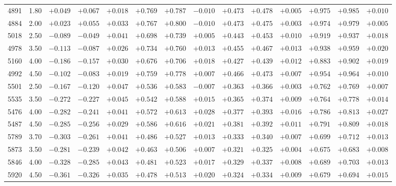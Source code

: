 \documentclass[]{aa}
\begin{document}
\begin{appendix}
\begin{table*}
\begin{center}
\begin{tabular}{llllllllllllll}
4891  &1.80& $ +0.049$&$  +0.067$&$  +0.018$&$  +0.769$&$  +0.787$&$  -0.010$&$  +0.473$&$  +0.478$&$  +0.005$&$  +0.975$&$  +0.985$&$  +0.010$\\
4884  &2.00& $ +0.023$&$  +0.055$&$  +0.033$&$  +0.767$&$  +0.800$&$  -0.010$&$  +0.473$&$  +0.475$&$  +0.003$&$  +0.974$&$  +0.979$&$  +0.005$\\
5018  &2.50& $ -0.089$&$  -0.049$&$  +0.041$&$  +0.698$&$  +0.739$&$  +0.005$&$  +0.443$&$  +0.453$&$  +0.010$&$  +0.919$&$  +0.937$&$  +0.018$\\
4978  &3.50& $ -0.113$&$  -0.087$&$  +0.026$&$  +0.734$&$  +0.760$&$  +0.013$&$  +0.455$&$  +0.467$&$  +0.013$&$  +0.938$&$  +0.959$&$  +0.020$\\
5160  &4.00& $ -0.186$&$  -0.157$&$  +0.030$&$  +0.676$&$  +0.706$&$  +0.018$&$  +0.427$&$  +0.439$&$  +0.012$&$  +0.883$&$  +0.902$&$  +0.019$\\
4992  &4.50& $ -0.102$&$  -0.083$&$  +0.019$&$  +0.759$&$  +0.778$&$  +0.007$&$  +0.466$&$  +0.473$&$  +0.007$&$  +0.954$&$  +0.964$&$  +0.010$\\
5501  &2.50& $ -0.167$&$  -0.120$&$  +0.047$&$  +0.536$&$  +0.583$&$  -0.007$&$  +0.363$&$  +0.366$&$  +0.003$&$  +0.762$&$  +0.769$&$  +0.007$\\
5535  &3.50& $ -0.272$&$  -0.227$&$  +0.045$&$  +0.542$&$  +0.588$&$  +0.015$&$  +0.365$&$  +0.374$&$  +0.009$&$  +0.764$&$  +0.778$&$  +0.014$\\
5476  &4.00& $ -0.282$&$  -0.241$&$  +0.041$&$  +0.572$&$  +0.613$&$  +0.028$&$  +0.377$&$  +0.393$&$  +0.016$&$  +0.786$&$  +0.813$&$  +0.027$\\
5487  &4.50& $ -0.285$&$  -0.256$&$  +0.029$&$  +0.586$&$  +0.616$&$  +0.021$&$  +0.381$&$  +0.392$&$  +0.011$&$  +0.791$&$  +0.809$&$  +0.018$\\
5789  &3.70& $ -0.303$&$  -0.261$&$  +0.041$&$  +0.486$&$  +0.527$&$  +0.013$&$  +0.333$&$  +0.340$&$  +0.007$&$  +0.699$&$  +0.712$&$  +0.013$\\
5873  &3.50& $ -0.281$&$  -0.239$&$  +0.042$&$  +0.463$&$  +0.506$&$  +0.007$&$  +0.321$&$  +0.325$&$  +0.004$&$  +0.675$&$  +0.683$&$  +0.008$\\
5846  &4.00& $ -0.328$&$  -0.285$&$  +0.043$&$  +0.481$&$  +0.523$&$  +0.017$&$  +0.329$&$  +0.337$&$  +0.008$&$  +0.689$&$  +0.703$&$  +0.013$\\
5920  &4.50& $ -0.361$&$  -0.326$&$  +0.035$&$  +0.478$&$  +0.513$&$  +0.020$&$  +0.324$&$  +0.334$&$  +0.009$&$  +0.679$&$  +0.694$&$  +0.015$\\

\end{tabular}
\end{center}
\end{table*}
\end{appendix}
\end{document}
